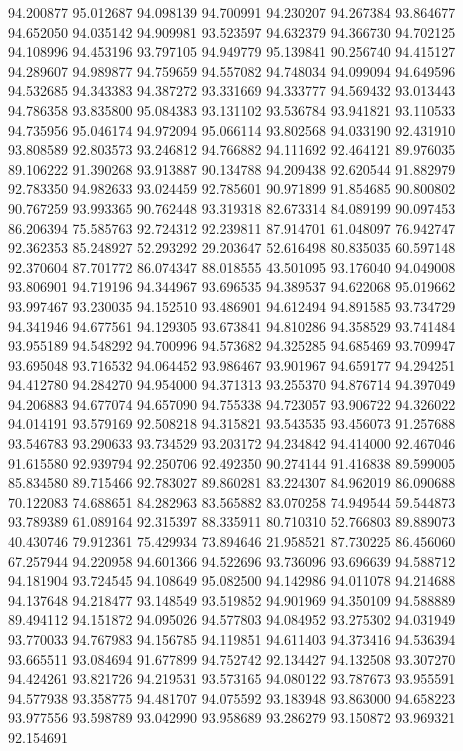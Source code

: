 94.200877
95.012687
94.098139
94.700991
94.230207
94.267384
93.864677
94.652050
94.035142
94.909981
93.523597
94.632379
94.366730
94.702125
94.108996
94.453196
93.797105
94.949779
95.139841
90.256740
94.415127
94.289607
94.989877
94.759659
94.557082
94.748034
94.099094
94.649596
94.532685
94.343383
94.387272
93.331669
94.333777
94.569432
93.013443
94.786358
93.835800
95.084383
93.131102
93.536784
93.941821
93.110533
94.735956
95.046174
94.972094
95.066114
93.802568
94.033190
92.431910
93.808589
92.803573
93.246812
94.766882
94.111692
92.464121
89.976035
89.106222
91.390268
93.913887
90.134788
94.209438
92.620544
91.882979
92.783350
94.982633
93.024459
92.785601
90.971899
91.854685
90.800802
90.767259
93.993365
90.762448
93.319318
82.673314
84.089199
90.097453
86.206394
75.585763
92.724312
92.239811
87.914701
61.048097
76.942747
92.362353
85.248927
52.293292
29.203647
52.616498
80.835035
60.597148
92.370604
87.701772
86.074347
88.018555
43.501095
93.176040
94.049008
93.806901
94.719196
94.344967
93.696535
94.389537
94.622068
95.019662
93.997467
93.230035
94.152510
93.486901
94.612494
94.891585
93.734729
94.341946
94.677561
94.129305
93.673841
94.810286
94.358529
93.741484
93.955189
94.548292
94.700996
94.573682
94.325285
94.685469
93.709947
93.695048
93.716532
94.064452
93.986467
93.901967
94.659177
94.294251
94.412780
94.284270
94.954000
94.371313
93.255370
94.876714
94.397049
94.206883
94.677074
94.657090
94.755338
94.723057
93.906722
94.326022
94.014191
93.579169
92.508218
94.315821
93.543535
93.456073
91.257688
93.546783
93.290633
93.734529
93.203172
94.234842
94.414000
92.467046
91.615580
92.939794
92.250706
92.492350
90.274144
91.416838
89.599005
85.834580
89.715466
92.783027
89.860281
83.224307
84.962019
86.090688
70.122083
74.688651
84.282963
83.565882
83.070258
74.949544
59.544873
93.789389
61.089164
92.315397
88.335911
80.710310
52.766803
89.889073
40.430746
79.912361
75.429934
73.894646
21.958521
87.730225
86.456060
67.257944
94.220958
94.601366
94.522696
93.736096
93.696639
94.588712
94.181904
93.724545
94.108649
95.082500
94.142986
94.011078
94.214688
94.137648
94.218477
93.148549
93.519852
94.901969
94.350109
94.588889
89.494112
94.151872
94.095026
94.577803
94.084952
93.275302
94.031949
93.770033
94.767983
94.156785
94.119851
94.611403
94.373416
94.536394
93.665511
93.084694
91.677899
94.752742
92.134427
94.132508
93.307270
94.424261
93.821726
94.219531
93.573165
94.080122
93.787673
93.955591
94.577938
93.358775
94.481707
94.075592
93.183948
93.863000
94.658223
93.977556
93.598789
93.042990
93.958689
93.286279
93.150872
93.969321
92.154691
